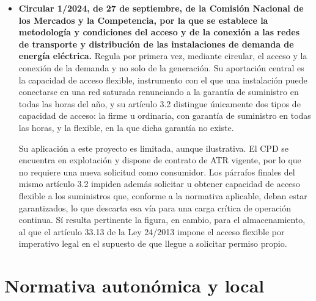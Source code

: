 \begin{itemize}
    Conviene advertir de una particularidad de lectura. La resolución no emplea en ningún punto la denominación 6.1TDA: indexa sus tablas por nivel de tensión tarifario, de NT0 a NT4. La correspondencia con el NT1 procede del artículo 6.3.c) de la Circular 3/2020 y debe explicitarse al citar la cifra, ya que de otro modo el valor parecería carecer de fuente. Por otro lado, la resolución correspondiente al ejercicio 2027 se publicará con posterioridad a la entrega de este trabajo, por lo que los valores de 2026 se consideran definitivos a efectos de cálculo.

    \item \textbf{Circular 1/2024, de 27 de septiembre, de la Comisión Nacional de los Mercados y la Competencia, por la que se establece la metodología y condiciones del acceso y de la conexión a las redes de transporte y distribución de las instalaciones de demanda de energía eléctrica.} Regula por primera vez, mediante circular, el acceso y la conexión de la demanda y no solo de la generación. Su aportación central es la capacidad de acceso flexible, instrumento con el que una instalación puede conectarse en una red saturada renunciando a la garantía de suministro en todas las horas del año, y su artículo 3.2 distingue únicamente dos tipos de capacidad de acceso: la firme u ordinaria, con garantía de suministro en todas las horas, y la flexible, en la que dicha garantía no existe.

    Su aplicación a este proyecto es limitada, aunque ilustrativa. El \ac{CPD} se encuentra en explotación y dispone de contrato de \ac{ATR} vigente, por lo que no requiere una nueva solicitud como consumidor. Los párrafos finales del mismo artículo 3.2 impiden además solicitar u obtener capacidad de acceso flexible a los suministros que, conforme a la normativa aplicable, deban estar garantizados, lo que descarta esa vía para una carga crítica de operación continua. Sí resulta pertinente la figura, en cambio, para el almacenamiento, al que el artículo 33.13 de la Ley 24/2013 impone el acceso flexible por imperativo legal en el supuesto de que llegue a solicitar permiso propio.
\end{itemize}

\section{Normativa autonómica y local}
\label{sec:norm-autonomica}

